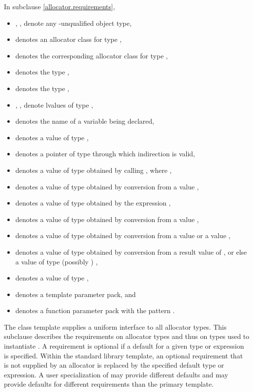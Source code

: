 \pnum
In subclause \ref{allocator.requirements},
\begin{itemize}
\item
{}, ,  denote
any \cv-unqualified object type,
\item
{} denotes an allocator class for type ,
\item
{} denotes the corresponding allocator class for type ,
\item
{} denotes the type ,
\item
{} denotes the type ,
\item
{}, ,  denote lvalues of type ,
\item
{} denotes the name of a variable being declared,
\item
{} denotes a value of type ,
\item
{} denotes a pointer of type 
through which indirection is valid,
\item
{} denotes a value of type 
obtained by calling , where ,
\item
{} denotes a value of type 
obtained by conversion from a value ,
\item
{} denotes a value of type 
obtained by the expression ,
\item
{} denotes a value of type 
obtained by conversion from a value ,
\item
{} denotes a value of type 
obtained by conversion from a value  or a value ,
\item
{} denotes a value of type 
obtained by conversion from a result value of , or else
a value of type (possibly ) ,
\item
{} denotes a value of type ,
\item
{} denotes a template parameter pack, and
\item
{} denotes
a function parameter pack with the pattern .
\end{itemize}

\pnum
The class template  supplies
a uniform interface to all allocator types.
This subclause
describes the requirements on allocator types
and thus on types used to instantiate .
A requirement is optional if a default for a
given type or expression is specified.
Within the standard library 
template, an optional requirement that is not supplied by an allocator is
replaced by the specified default type or expression. A user specialization of
 may provide different defaults and may provide
defaults for different requirements than the primary template.

